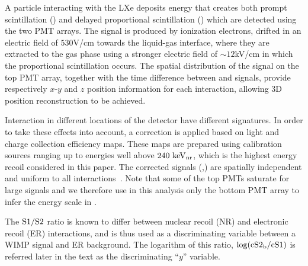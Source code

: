 A particle interacting with the LXe deposits energy that creates both
prompt scintillation (\Si{}) and delayed proportional scintillation (\Sii{}) which are detected using the two PMT arrays. The \Sii{} signal is produced by ionization electrons, drifted in an electric field of $530$V/cm towards the liquid-gas interface, where they are extracted to the gas phase using a stronger electric field of $\sim12$kV/cm in which the proportional scintillation occurs. 
The spatial distribution of the \Sii{} signal on the top PMT array, together with the time difference between \Si{} and \Sii{} signals, provide respectively $x$-$y$ and $z$ position information for each interaction, allowing 3D position reconstruction to be achieved.

Interaction in different locations of  the detector have different signatures. In order to take these effects into account, a correction is applied based on light and charge collection efficiency maps. These maps are prepared using calibration sources ranging up to energies well above $240~\mathrm{keV_\mathrm{nr}}$, which is the highest energy recoil considered in this paper. The corrected signals (\cSi{},\cSiib{}) are spatially independent and uniform to all interactions~\cite{xe100_instr2012}. Note that some of the top PMTs saturate for large \Sii{} signals and we therefore use in this analysis only the bottom PMT array to infer the energy scale in \Sii{}.

The $\mathrm{S1}{}/\mathrm{S2}{}$ ratio is known to differ between nuclear recoil (NR) and electronic recoil (ER) interactions, and is thus used as a discriminating variable between a WIMP signal and ER background. The logarithm of this ratio, $\log(\mathrm{cS2}_\mathrm{b}{}/\mathrm{cS1}{})$ is referred later in the text as the discriminating ``$y$'' variable.


